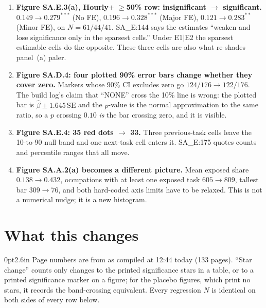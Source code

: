 \documentclass[10pt]{article}
\newcommand{\file}[1]{{\ttfamily\detokenize{#1}}}
\newcommand{\ra}{\ensuremath{\rightarrow}}
\newenvironment{prose}{\begin{adjustwidth}{0pt}{2.6in}}{\end{adjustwidth}}
\begin{document}
\vspace{2pt}
\begin{tcolorbox}[colback=shade,colframe=warncol,boxrule=0.8pt,arc=1pt,
  title={\bfseries Four results that change what the paper can claim},coltitle=white,colbacktitle=warncol,fonttitle=\bfseries]
\footnotesize
\begin{enumerate}[leftmargin=1.5em,topsep=1pt,itemsep=2pt]
\item \textbf{Figure SA.E.3(a), Hourly$+$ $\geq$50\% row: insignificant \ra{} significant.}
      $0.149 \ra 0.279^{***}$ (No FE), $0.196 \ra 0.328^{***}$ (Major FE), $0.121 \ra 0.283^{**}$
      (Minor FE), on $N=61/44/41$. SA\_E:144 says the estimates ``weaken and lose significance only in
      the sparsest cells.'' Under E1$|$E2 the sparsest estimable cells do the opposite. These three
      cells are also what re-shades panel~(a) paler.
\item \textbf{Figure SA.D.4: four plotted 90\% error bars change whether they cover zero.}
      Markers whose 90\% CI excludes zero go $124/176 \ra 122/176$. The build log's claim that
      ``NONE'' cross the 10\% line is wrong: the plotted bar is $\hat{\beta}\pm1.645\,\mathrm{SE}$ and
      the $p$-value is the normal approximation to the same ratio, so a $p$ crossing $0.10$ \emph{is}
      the bar crossing zero, and it is visible.
\item \textbf{Figure SA.E.4: 35 red dots \ra{} 33.} Three previous-task cells leave the 10-to-90 null
      band and one next-task cell enters it. SA\_E:175 quotes counts and percentile ranges that all move.
\item \textbf{Figure SA.A.2(a) becomes a different picture.} Mean exposed share $0.138 \ra 0.432$,
      occupations with at least one exposed task $605 \ra 809$, tallest bar $309 \ra 76$, and both
      hard-coded axis limits have to be relaxed. This is not a numerical nudge; it is a new histogram.
\end{enumerate}
\end{tcolorbox}

\clearpage
\section{What this changes}\label{sec:summary}

\begin{prose}
Page numbers are from \file{writeup/0_main.pdf} as compiled at 12:44 today (133 pages).
``Star change'' counts only changes to the printed significance stars in a table, or to a printed
significance marker on a figure; for the placebo figures, which print no stars, it records the
band-crossing equivalent. Every regression $N$ is identical on both sides of every row below.
\end{prose}
\end{document}
